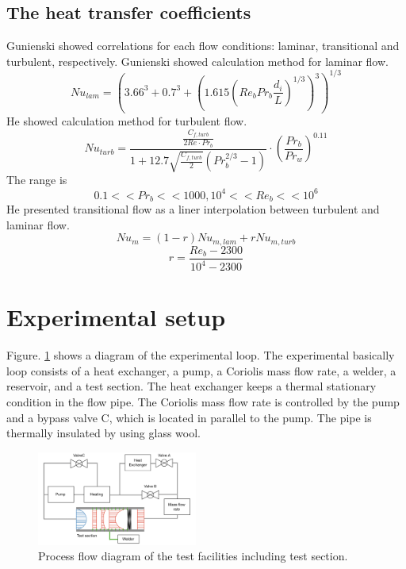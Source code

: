 \documentclass[conference]{IEEEtran}
\begin{document}
\subsection{The heat transfer coefficients}
Gunienski\cite{Gnienlinski2010} showed correlations for each flow conditions: laminar, transitional and turbulent, respectively.
Gunienski\cite{Gnienlinski2010} showed calculation method for laminar flow.
\begin{equation}
    Nu_{lam}=(3.66^{3}+0.7^{3}+(1.615(Re_{b}Pr_{b}\frac{d_{i}}{L})^{1/3})^{3})^{1/3}
    \label{Nu_laminar}
\end{equation}
He showed calculation method for turbulent flow.
\begin{equation}
    Nu_{turb}=\frac{\frac{C_{f,turb}}{2Re\cdot Pr_{b}}}{1+12.7 \sqrt{\frac{C_{f,turb}}{2}}(Pr_{b}^{2/3}-1)}\cdot (\frac{Pr_{b}}{Pr_{w}})^{0.11}
    \label{Nu_turbulent}
\end{equation}
The range is
\begin{equation}
    0.1<<Pr_{b}<<1000, 10^{4}<<Re_{b}<<10^{6}
\end{equation}
He presented transitional flow as a liner interpolation between turbulent and laminar flow.
\begin{equation}
    Nu_{m}=(1-r)Nu_{m,lam}+rNu_{m,turb}
    \label{Nu_transitional}
\end{equation}
\begin{equation}
    r=\frac{Re_{b}-2300}{10^{4}-2300}
\end{equation}


\section{Experimental setup}
Figure. \ref{experimental_loop} shows a diagram of the experimental loop.
The experimental basically loop consists of a heat exchanger, a pump, a Coriolis mass flow rate, a welder, a reservoir, and a test section.
The heat exchanger keeps a thermal stationary condition in the flow pipe.
The Coriolis mass flow rate is controlled by the pump and a bypass valve C, which is located in parallel to the pump.
The pipe is thermally insulated by using glass wool.\\

\begin{figure}[htbp]
\centering
\vspace{-4zh}
\includegraphics[width=0.47\textwidth,natwidth=920,natheight=700]{fig/experimental_loop.png}
\caption{Process flow diagram of the test facilities including test section.}
\label{experimental_loop}
\end{figure}
\end{document}
